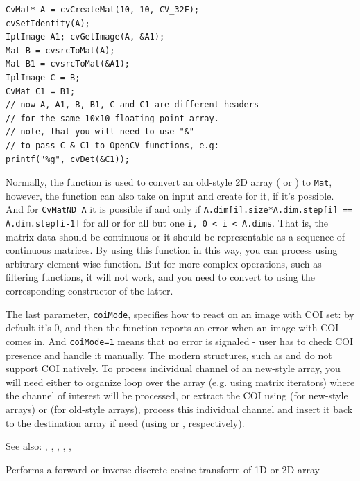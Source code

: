 \begin{lstlisting}
CvMat* A = cvCreateMat(10, 10, CV_32F);
cvSetIdentity(A);
IplImage A1; cvGetImage(A, &A1);
Mat B = cvsrcToMat(A);
Mat B1 = cvsrcToMat(&A1);
IplImage C = B;
CvMat C1 = B1;
// now A, A1, B, B1, C and C1 are different headers
// for the same 10x10 floating-point array.
// note, that you will need to use "&"
// to pass C & C1 to OpenCV functions, e.g:
printf("%g", cvDet(&C1));
\end{lstlisting}

Normally, the function is used to convert an old-style 2D array ( or ) to \texttt{Mat}, however, the function can also take  on input and create  for it, if it's possible. And for \texttt{CvMatND A} it is possible if and only if \texttt{A.dim[i].size*A.dim.step[i] == A.dim.step[i-1]} for all or for all but one \texttt{i, 0 < i < A.dims}. That is, the matrix data should be continuous or it should be representable as a sequence of continuous matrices. By using this function in this way, you can process  using arbitrary element-wise function. But for more complex operations, such as filtering functions, it will not work, and you need to convert  to  using the corresponding constructor of the latter.

The last parameter, \texttt{coiMode}, specifies how to react on an image with COI set: by default it's 0, and then the function reports an error when an image with COI comes in. And \texttt{coiMode=1} means that no error is signaled - user has to check COI presence and handle it manually. The modern structures, such as  and  do not support COI natively. To process individual channel of an new-style array, you will need either to organize loop over the array (e.g. using matrix iterators) where the channel of interest will be processed, or extract the COI using  (for new-style arrays) or  (for old-style arrays), process this individual channel and insert it back to the destination array if need (using  or , respectively).

See also: , , , , , 


\label{dct}
Performs a forward or inverse discrete cosine transform of 1D or 2D array

